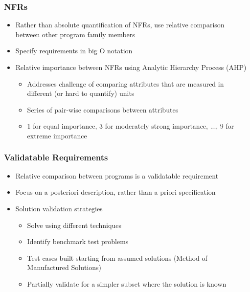 \documentclass[t,12pt,numbers,fleqn]{beamer}
\begin{document}
\begin{frame}

\frametitle{NFRs}

\begin{itemize}

\item Rather than absolute quantification of NFRs, use relative comparison between other program family members
\item Specify requirements in big O notation
\item Relative importance between NFRs using Analytic Hierarchy Process (AHP) \cite{Saaty1980}
\begin{itemize}
\item Addresses challenge of comparing attributes that are measured in different (or hard to quantify) units
\item Series of pair-wise comparisons between attributes
\item 1 for equal importance, 3 for moderately strong importance, ..., 9 for extreme importance
\end{itemize}

\end{itemize}

\end{frame}


\begin{frame}

\frametitle{Validatable Requirements}

\begin{itemize}

\item Relative comparison between programs is a validatable requirement
\item Focus on a posteriori description, rather than a priori specification
\item Solution validation strategies
\begin{itemize}
\item Solve using different techniques
\item Identify benchmark test problems %
\item Test cases built starting from assumed solutions (Method of Manufactured Solutions)
\item Partially validate for a simpler subset where the solution is known
\end{itemize}

\end{itemize}

\end{frame}
\end{document}
